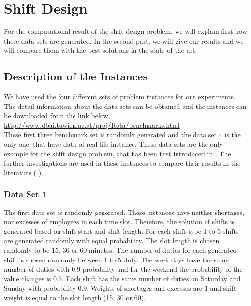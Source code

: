 \section{Shift Design}

For the computational result of the shift design problem, we will explain first how these data sets are generated. In the second part, we will give our results and we will compare them with the best solutions in the state-of-the-art.

\subsection{Description of the Instances}

We have used the four different sets of problem instances for our experiments. The detail information about the data sets can be obtained and the instances can be downloaded from the link below,\\


\url{http://www.dbai.tuwien.ac.at/proj/Rota/benchmarks.html} \\

These first three benchmark set is randomly generated and the data set 4 is the only one, that have data of real life instance. These data sets are the only example for the shift design problem, that has been first introduced in \cite{li:2004:musliu} \cite{li:2001:musliu}. The further investigations are used in these instances to compare their results in the literature (\cite{li:2004:musliu} \cite{li:2010:abseher} \cite{li:2007:gaspero}). 

\subsubsection{Data Set 1}
The first data set is randomly generated. These instances have neither shortages, nor excesses of employees in each time slot. Therefore, the solution of shifts is generated based on shift start and shift length. For each shift type 1 to 5 shifts are generated randomly with equal probability. The slot length is chosen randomly to be 15, 30 or 60 minutes. The number of duties for each generated shift is chosen randomly between 1 to 5 duty. The week days have the same number of duties with 0.9 probability and for the weekend the probability of the value changes is 0.6. Each shift has the same number of duties on Saturday and Sunday with probability 0.9. Weights of shortages and excesses are 1 and shift weight is equal to the slot length (15, 30 or 60).

